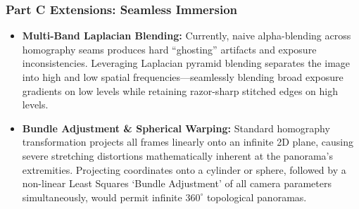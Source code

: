 \documentclass[a4paper,12pt]{article}
\begin{document}
\subsubsection{Part C Extensions: Seamless Immersion}
\begin{itemize}
    \item \textbf{Multi-Band Laplacian Blending:} Currently, naive alpha-blending across homography seams produces hard ``ghosting'' artifacts and exposure inconsistencies. Leveraging Laplacian pyramid blending separates the image into high and low spatial frequencies---seamlessly blending broad exposure gradients on low levels while retaining razor-sharp stitched edges on high levels.
    \item \textbf{Bundle Adjustment \& Spherical Warping:} Standard homography transformation projects all frames linearly onto an infinite 2D plane, causing severe stretching distortions mathematically inherent at the panorama's extremities. Projecting coordinates onto a cylinder or sphere, followed by a non-linear Least Squares `Bundle Adjustment' of all camera parameters simultaneously, would permit infinite $360^{\circ}$ topological panoramas.
\end{itemize}
\end{document}
